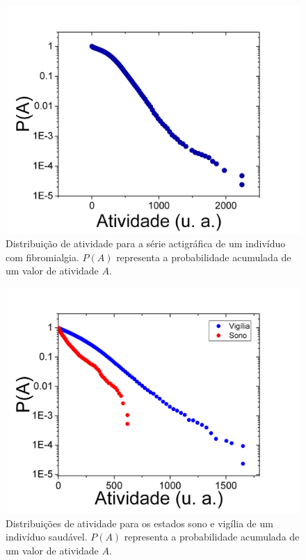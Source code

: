 \documentclass{ufscThesis}
\begin{document}
\begin{figure}[!h]
\centering
\includegraphics[scale=0.3]{dist_all.png}
\caption{Distribuição de atividade para a série actigráfica de um indivíduo com fibromialgia. $P(A)$ representa a probabilidade acumulada de um valor de atividade $A$.}
\label{distall}
\end{figure}

\begin{figure}[!h]
\centering
\includegraphics[scale=0.3]{dist_ativo_sono.png}
\caption{Distribuições de atividade para os estados sono e vigília de um indivíduo saudável. $P(A)$ representa a probabilidade acumulada de um valor de atividade $A$.}
\label{distativosono}
\end{figure}
\end{document}

